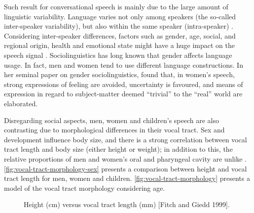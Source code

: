 Such result for conversational speech is mainly due to the large amount of linguistic variability. Language varies not only among speakers (the so-called inter-speaker variability), but also within the same speaker (intra-speaker) \citep{Benzeghiba2007}.  Considering inter-speaker differences, factors such as gender, age, social, and regional 
origin, health and emotional state might have a huge impact on the speech signal \citep{Benzeghiba2007}.
Sociolinguistics has long known that gender affects language usage. In fact, men and women tend to use different language constructions.
In her seminal paper on gender sociolinguistics, \citet{Lakoff1973} found that, in women's speech, strong expressions 
of feeling are avoided, uncertainty is favoured, and means of expression in regard to subject-matter deemed ``trivial'' to the 
``real'' world are elaborated. 

Disregarding social aspects, men, women and children's speech are also contrasting due to morphological differences
in their vocal tract. Sex and development influence body size, and there is a strong correlation between vocal tract length and body size 
(either height or weight); in addition to this, the relative proportions of men and women's oral and pharyngeal cavity are unlike 
\cite{Fitch1999}. \autoref{fig:vocal-tract-morphology-sex} presents a comparison between height and
vocal tract length for men, women and children. \autoref{fig:vocal-tract-morphology} presents a model of the vocal tract morphology considering
age.

\begin{figure}[!ht]
        \noindent{}
        \caption{Height (cm) versus vocal tract length (mm) [Fitch and Giedd 1999].}
        \label{fig:vocal-tract-morphology-sex}
\end{figure}

